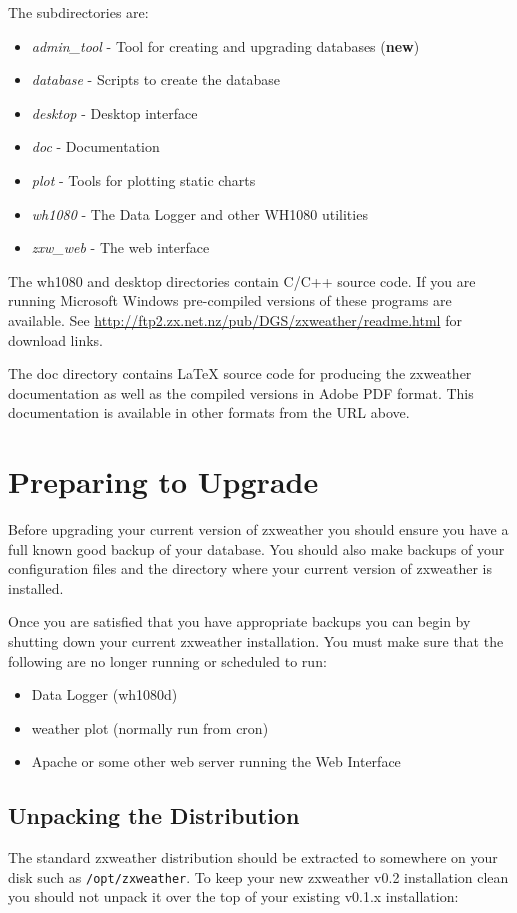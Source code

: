 \documentclass[a4paper,10pt,draft]{book}
\begin{document}
The subdirectories are:

\begin{itemize}
\item \emph{admin\_tool} - Tool for creating and upgrading databases (\textbf{new})
\item \emph{database} - Scripts to create the database
\item \emph{desktop}  - Desktop interface
\item \emph{doc} - Documentation
\item \emph{plot} - Tools for plotting static charts
\item \emph{wh1080} - The Data Logger and other WH1080 utilities
\item \emph{zxw\_web} - The web interface
\end{itemize}

The wh1080 and desktop directories contain C/C++ source code. If you are running Microsoft Windows pre-compiled versions of these programs are available. See \url{http://ftp2.zx.net.nz/pub/DGS/zxweather/readme.html} for download links.

The doc directory contains \LaTeX{} source code for producing the zxweather documentation as well as the compiled versions in Adobe PDF format. This documentation is available in other formats from the URL above.

\chapter{Preparing to Upgrade}
Before upgrading your current version of zxweather you should ensure you have a full known good backup of your database. You should also make backups of your configuration files and the directory where your current version of zxweather is installed.

Once you are satisfied that you have appropriate backups you can begin by shutting down your current zxweather installation. You must make sure that the following are no longer running or scheduled to run:
\begin{itemize}
\item Data Logger (wh1080d)
\item weather plot (normally run from cron)
\item Apache or some other web server running the Web Interface
\end{itemize}

\section{Unpacking the Distribution}
\label{sec_unpack}
The standard zxweather distribution should be extracted to somewhere on your disk such as \verb|/opt/zxweather|. To keep your new zxweather v0.2 installation clean you should not unpack it over the top of your existing v0.1.x installation:
\end{document}
